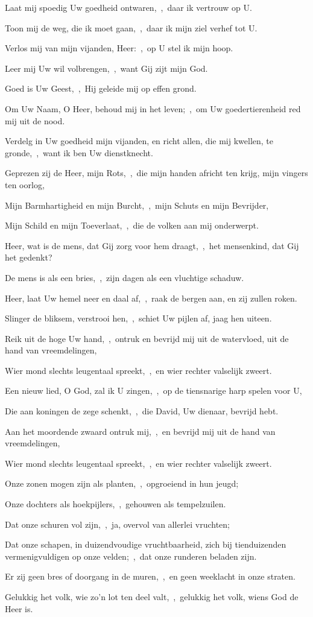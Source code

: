 \documentclass[12pt,twoside,a5paper]{article}
\begin{document}
\begin{halfparskip}
  Laat mij spoedig Uw goedheid ontwaren,~\sep\ daar ik vertrouw op U.

  Toon mij de weg, die ik moet gaan,~\sep\ daar ik mijn ziel verhef tot U.

  Verlos mij van mijn vijanden, Heer:~\sep\ op U stel ik mijn hoop.

  Leer mij Uw wil volbrengen,~\sep\ want Gij zijt mijn God.

  Goed is Uw Geest,~\sep\ Hij geleide mij op effen grond.

  Om Uw Naam, O Heer, behoud mij in het leven;~\sep\ om Uw goedertierenheid red mij uit de nood.

  Verdelg in Uw goedheid mijn vijanden, en richt allen, die mij kwellen, te gronde,~\sep\ want ik ben Uw dienstknecht.

   Geprezen zij de Heer, mijn Rots,~\sep\ die mijn handen africht ten krijg, mijn vingers ten oorlog,

  Mijn Barmhartigheid en mijn Burcht,~\sep\ mijn Schuts en mijn Bevrijder,

  Mijn Schild en mijn Toeverlaat,~\sep\ die de volken aan mij onderwerpt.

  Heer, wat is de mens, dat Gij zorg voor hem draagt,~\sep\ het mensenkind, dat Gij het gedenkt?

  De mens is als een bries,~\sep\ zijn dagen als een vluchtige schaduw.

  Heer, laat Uw hemel neer en daal af,~\sep\ raak de bergen aan, en zij zullen roken.

  Slinger de bliksem, verstrooi hen,~\sep\ schiet Uw pijlen af, jaag hen uiteen.

  Reik uit de hoge Uw hand,~\sep\ ontruk en bevrijd mij uit de watervloed, uit de hand van vreemdelingen,

  Wier mond slechts leugentaal spreekt,~\sep\ en wier rechter valselijk zweert.

  Een nieuw lied, O God, zal ik U zingen,~\sep\ op de tiensnarige harp spelen voor U,

  Die aan koningen de zege schenkt,~\sep\ die David, Uw dienaar, bevrijd hebt.

  Aan het moordende zwaard ontruk mij,~\sep\ en bevrijd mij uit de hand van vreemdelingen,

  Wier mond slechts leugentaal spreekt,~\sep\ en wier rechter valselijk zweert.

  Onze zonen mogen zijn als planten,~\sep\ opgroeiend in hun jeugd;

  Onze dochters als hoekpijlers,~\sep\ gehouwen als tempelzuilen.

  Dat onze schuren vol zijn,~\sep\ ja, overvol van allerlei vruchten;

  Dat onze schapen, in duizendvoudige vruchtbaarheid, zich bij tienduizenden vermenigvuldigen op onze velden;~\sep\ dat onze runderen beladen zijn.

  Er zij geen bres of doorgang in de muren,~\sep\ en geen weeklacht in onze straten.

  Gelukkig het volk, wie zo'n lot ten deel valt,~\sep\ gelukkig het volk, wiens God de Heer is.
\end{halfparskip}
\end{document}
